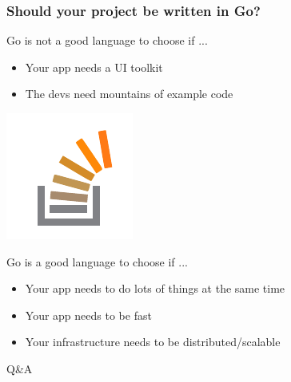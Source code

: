 \documentclass{beamer}
\begin{document}
\begin{frame}
  \frametitle{Should your project be written in Go?}
  Go is not a good language to choose if ...
  \begin{itemize}
    \item Your app needs a UI toolkit
    \item The devs need mountains of example code
  \end{itemize}
  \vfill
  \begin{flushright}
    \includegraphics[height=3\baselineskip]{includes/stackoverflow.png}
  \end{flushright}
\end{frame}
\begin{frame}
  Go is a good language to choose if ...
  \begin{itemize}
    \item Your app needs to do lots of things at the same time
    \item Your app needs to be fast
    \item Your infrastructure needs to be distributed/scalable
  \end{itemize}
\end{frame}
\begin{frame}
  \begin{center}
    {\huge Q\&A}
  \end{center}
\end{frame}
\end{document}
